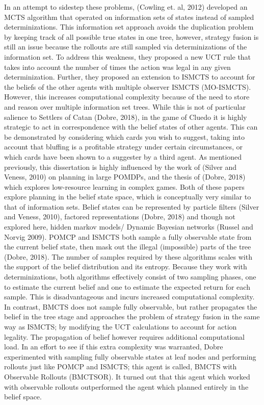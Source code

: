 \documentclass[a4paper,12pt]{proposal}
\begin{document}
In an attempt to sidestep these problems, (Cowling et. al, 2012) developed an MCTS algorithm that operated on information sets of states instead of sampled determinizations. This information set approach avoids the duplication problem by keeping track of all possible true states in one tree, however, strategy fusion is still an issue because the rollouts are still sampled via determinizations of the information set. To address this weakness, they proposed a new UCT rule that takes into account the number of times the action was legal in any given determinization. Further, they proposed an extension to ISMCTS to account for the beliefs of the other agents with multiple observer ISMCTS (MO-ISMCTS). However, this increases computational complexity because of the need to store and reason over multiple information set trees. While this is not of particular salience to Settlers of Catan (Dobre, 2018), in the game of Cluedo it is highly strategic to act in correspondence with the belief states of other agents. This can be demonstrated by considering which cards you wish to suggest, taking into account that bluffing is a profitable strategy under certain circumstances, or which cards have been shown to a suggester by a third agent. As mentioned previously, this dissertation is highly influenced by the work of (Silver and Veness, 2010) on planning in large POMDPs, and the thesis of (Dobre, 2018) which explores low-resource learning in complex games. Both of these papers explore planning in the belief state space, which is conceptually very similar to that of information sets. Belief states can be represented by particle filters (Silver and Veness, 2010), factored representations (Dobre, 2018) and though not explored here, hidden markov models/ Dynamic Bayesian networks (Russel and Norvig 2009). POMCP and ISMCTS both sample a fully observable state from the current belief state, then mask out the illegal (impossible) parts of the tree (Dobre, 2018). The number of samples required by these algorithms scales with the support of the belief distribution and its entropy. Because they work with determinizations, both algorithms effectively consist of two sampling phases, one to estimate the current belief and one to estimate the expected return for each sample. This is disadvantageous and incurs increased computational complexity. In contrast, BMCTS does not sample fully observable, but rather propagates the belief in the tree stage and approaches the problem of strategy fusion in the same way as ISMCTS; by modifying the UCT calculations to account for action legality. The propagation of belief however requires additional computational load. In an effort to see if this extra complexity was warranted, Dobre experimented with sampling fully observable states at leaf nodes and performing rollouts just like POMCP and ISMCTS; this agent is called, BMCTS with Observable Rollouts (BMCTSOR). It turned out that this agent which worked with observable rollouts outperformed the agent which planned entirely in the belief space.
\end{document}
